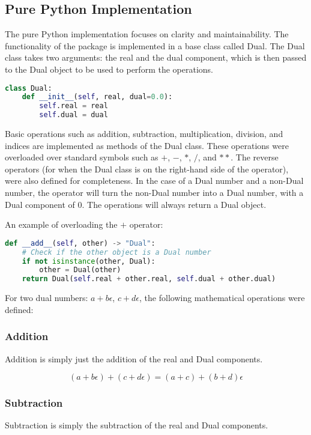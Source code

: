 \subsection{Pure Python Implementation}
The pure Python implementation focuses on clarity and maintainability. 
The functionality of the package is implemented in a base class called Dual.
The Dual class takes two arguments: the real and the dual component, 
which is then passed to the Dual object to be used to perform the operations.

\begin{lstlisting}[language=Python]
class Dual:
    def __init__(self, real, dual=0.0):
        self.real = real
        self.dual = dual
\end{lstlisting}

Basic operations such as addition, subtraction, multiplication, division, and indices are implemented as methods of the Dual class. 
These operations were overloaded over standard symbols such as $+$, $-$, $*$, $/$, and $**$.
The reverse operators (for when the Dual class is on the right-hand side of the operator), were also defined for completeness. 
In the case of a Dual number and a non-Dual number, the operator will turn the non-Dual number into a Dual number, 
with a Dual component of 0. The operations will always return a Dual object. 

An example of overloading the $+$ operator:

\begin{lstlisting}[language=Python]
    def __add__(self, other) -> "Dual":
    # Check if the other object is a Dual number
    if not isinstance(other, Dual):
        other = Dual(other)
    return Dual(self.real + other.real, self.dual + other.dual)
\end{lstlisting}

For two dual numbers: $a + b\epsilon$, $c + d\epsilon$, the following mathematical operations were defined:

\subsubsection{Addition}
Addition is simply just the addition of the real and Dual components.

\begin{equation}
    (a + b\epsilon) + (c + d\epsilon) = (a + c) + (b + d)\epsilon
    \label{eq:addition}
    \end{equation}

\subsubsection{Subtraction}
Subtraction is simply the subtraction of the real and Dual components.

